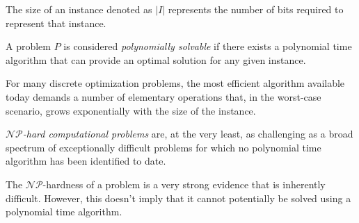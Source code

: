 \begin{definition}
    The size of an instance denoted as $\left\lvert I \right\rvert$ represents the number of bits required to represent that instance.

    A problem $P$ is considered \emph{polynomially solvable} if there exists a polynomial time algorithm that can provide an optimal solution for any given instance.
\end{definition}
For many discrete optimization problems, the most efficient algorithm available today demands a number of elementary operations that, in the worst-case scenario, grows exponentially with the size of the instance.
\begin{definition}
    \emph{$\mathcal{NP}$-hard computational problems} are, at the very least, as challenging as a broad spectrum of exceptionally difficult problems for which no polynomial time algorithm has been identified to date.
\end{definition}
The $\mathcal{N}\mathcal{P}$-hardness of a problem is a very strong evidence that is inherently difficult. 
However, this doesn't imply that it cannot potentially be solved using a polynomial time algorithm.